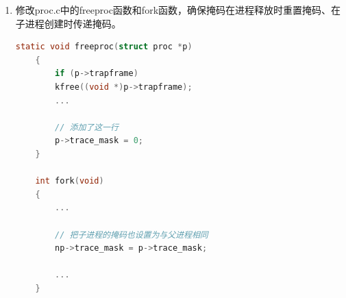 \begin{enumerate}
\begin{lstlisting}[language=c, title=对syscall函数的修改]
            // 如果掩码对应，输出当前系统调用信息
            if ((trace_mask >> num) & 1)
            {
                printf("%d: syscall %s -> %d\n", 
                        p->pid, 
                        syscall_names[num - 1], 
                        p->trapframe->a0);
            }
        }
        else
        {
            ...
        }
    }
    \end{lstlisting}
    \item 修改proc.c中的freeproc函数和fork函数，确保掩码在进程释放时重置掩码、在子进程创建时传递掩码。
          \newpage
          \begin{lstlisting}[language=c, title=对proc.c的修改]
    static void freeproc(struct proc *p)
    {
        if (p->trapframe)
        kfree((void *)p->trapframe);
        ...

        // 添加了这一行
        p->trace_mask = 0;
    }

    int fork(void)
    {
        ...

        // 把子进程的掩码也设置为与父进程相同
        np->trace_mask = p->trace_mask;

        ...
    }
    \end{lstlisting}
\end{enumerate}

